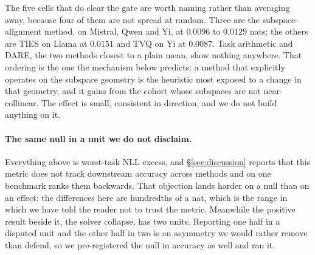 The five cells that do clear the gate are worth naming rather than
averaging away, because four of them are not spread at random. Three are
the subspace-alignment method, on Mistral, Qwen and Yi, at $0.0096$ to
$0.0129$ nats; the others are TIES on Llama at $0.0151$ and TVQ on Yi at
$0.0087$. Task arithmetic and DARE, the two methods closest to a plain
mean, show nothing anywhere. That ordering is the one the mechanism below
predicts: a method that explicitly operates on the subspace geometry is
the heuristic most exposed to a change in that geometry, and it gains from
the cohort whose subspaces are not near-collinear. The effect is small,
consistent in direction, and we do not build anything on it.

\paragraph{The same null in a unit we do not disclaim.} Everything above is
worst-task NLL excess, and \S\ref{sec:discussion} reports that this metric does
not track downstream accuracy across methods and on one benchmark ranks them
backwards. That objection lands harder on a null than on an effect: the
differences here are hundredths of a nat, which is the range in which we have
told the reader not to trust the metric. Meanwhile the positive result beside
it, the solver collapse, has two units. Reporting one half in a disputed unit
and the other half in two is an asymmetry we would rather remove than defend,
so we pre-registered the null in accuracy as well and ran it.

